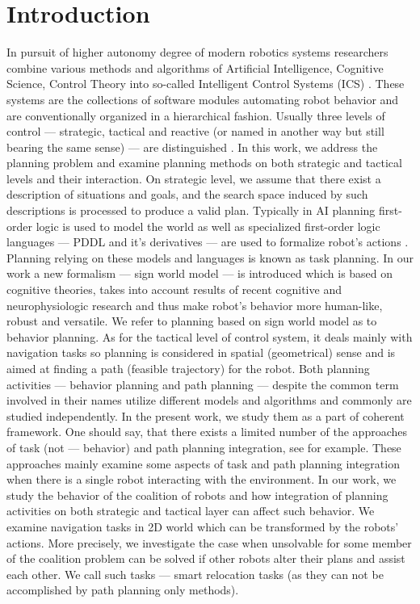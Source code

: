\documentclass[runningheads,a4paper]{llncs}
\begin{document}
\section{Introduction}

In pursuit of higher autonomy degree of modern robotics systems researchers combine various methods and algorithms of Artificial Intelligence, Cognitive Science, Control Theory into so-called Intelligent Control Systems (ICS) \cite{Albus2002,Yoo2015}. These systems are the collections of software modules automating robot behavior and are conventionally organized in a hierarchical fashion. Usually three levels of control --- strategic, tactical and reactive (or named in another way but still bearing the same sense) --- are distinguished \cite{Emelyanov2015}. In this work, we address the planning problem and examine planning methods on both strategic and tactical levels and their interaction. On strategic level, we assume that there exist a description of situations and goals, and the search space induced by such descriptions is processed to produce a valid plan. Typically in AI planning \cite{Ghallab2004} first-order logic is used to model the world as well as specialized first-order logic languages --- PDDL and it's derivatives --- are used to formalize robot's actions \cite{Ghallab1998,Fox2003}. Planning relying on these models and languages is known as task planning. In our work a new formalism --- sign world model --- is introduced which is based on cognitive theories, takes into account results of recent cognitive and neurophysiologic research and thus make robot's behavior more human-like, robust and versatile. We refer to planning based on sign world model as to behavior planning. As for the tactical level of control system, it deals mainly with navigation tasks so planning is considered in spatial (geometrical) sense and is aimed at finding a path (feasible trajectory) for the robot. Both planning activities --- behavior planning and path planning --- despite the common term involved in their names utilize different models and algorithms and commonly are studied independently. In the present work, we study them as a part of coherent framework. One should say, that there exists a limited number of the approaches of task (not --- behavior) and path planning integration, see \cite{Karlsson2012,Abdo2012} for example. These approaches mainly examine some aspects of task and path planning integration when there is a single robot interacting with the environment. In our work, we study the behavior of the coalition of robots and how integration of planning activities on both strategic and tactical layer can affect such behavior. We examine navigation tasks in 2D world which can be transformed by the robots' actions. More precisely, we investigate the case when unsolvable for some member of the coalition problem can be solved if other robots alter their plans and assist each other. We call such tasks --- smart relocation tasks (as they can not be accomplished by path planning only methods).
\end{document}
